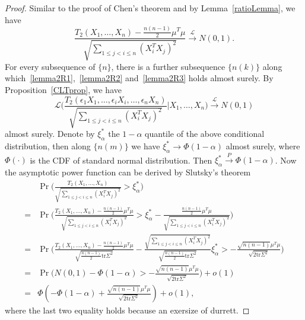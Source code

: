 \documentclass[review]{elsarticle}
\theoremstyle{plain}
\theoremstyle{definition}
\theoremstyle{remark}
\begin{document}
\begin{proof}
    Similar to the proof of Chen's theorem and by Lemma~\ref{ratioLemma}, we have
    \begin{equation}
        \frac{T_2(X_1,\ldots,X_n)-\frac{n(n-1)}{2}\mu^T\mu}{\sqrt{\sum_{1\leq j< i\leq n}(X_i^T X_j)^2}}\xrightarrow{\mathcal{L}}N(0,1).
    \end{equation}
    For every subsequence of $\{n\}$, there is a further subsequence $\{n(k)\}$ along which~\eqref{lemma2R1},~\eqref{lemma2R2} and~\eqref{lemma2R3} holds almost surely.
    By Proposition~\ref{CLTprop}, we have
    \begin{equation}
        \mathcal{L}\Big(\frac{T_2(\epsilon_1 X_1,\ldots, \epsilon_i X_i,\ldots,\epsilon_n X_n)}{\sqrt{\sum_{1\leq j<i\leq n}{(X_i^T X_j)}^2}}\Big|X_1,\ldots,X_n\Big)\xrightarrow{\mathcal{L}}N(0,1)
    \end{equation}
    almost surely.
    Denote by $\xi_{\alpha}^*$ the $1-\alpha$ quantile of the above conditional distribution, then along $\{n(m)\}$ we have $\xi_{\alpha}^*\to \Phi(1-\alpha)$ almost surely, where $\Phi(\cdot)$ is the CDF of standard normal distribution. Then $\xi^*_{\alpha}\xrightarrow{P}\Phi(1-\alpha)$.
    Now the asymptotic power function can be derived by Slutsky's theorem
    \begin{equation}
        \begin{aligned}
            &\Pr\Big(\frac{T_2( X_1,\ldots, X_n)}{\sqrt{\sum_{1\leq j<i\leq n}{(X_i^T X_j)}^2}}>\xi_{\alpha}^* \Big)\\
            =&
            \Pr\Big(\frac{T_2( X_1,\ldots, X_n)-\frac{n(n-1)}{2}\mu^T\mu}{\sqrt{\sum_{1\leq j<i\leq n}{(X_i^T X_j)}^2}}>\xi_{\alpha}^*-\frac{\frac{n(n-1)}{2}\mu^T\mu}{\sqrt{\sum_{1\leq j<i\leq n}{(X_i^T X_j)}^2}} \Big)\\
            =&
            \Pr\Big(\frac{T_2( X_1,\ldots, X_n)-\frac{n(n-1)}{2}\mu^T\mu}{\sqrt{\frac{n(n-1)}{2}\mathrm{tr}\Sigma^2}}-
            \frac{\sqrt{\sum_{1\leq j<i\leq n}{(X_i^T X_j)}^2}}{\sqrt{\frac{n(n-1)}{2}\mathrm{tr}\Sigma^2}}\xi_{\alpha}^*>
            -\frac{\sqrt{n(n-1)}\mu^T\mu}{\sqrt{2\mathrm{tr}\Sigma^2}} \Big)\\
            =&
            \Pr\Big(N(0,1)-\Phi(1-\alpha)>-\frac{\sqrt{n(n-1)}\mu^T\mu}{\sqrt{2\mathrm{tr}\Sigma^2}}\Big)+o(1)\\
            =&
            \Phi(-\Phi(1-\alpha)+\frac{\sqrt{n(n-1)}\mu^T\mu}{\sqrt{2\mathrm{tr}\Sigma^2}})+o(1),
        \end{aligned}
    \end{equation}
    where the last two equality holds because an exersize of durrett.



\end{proof}
\end{document}
